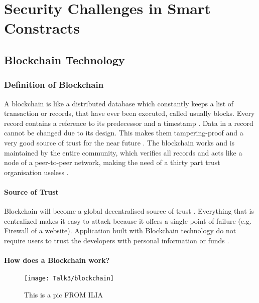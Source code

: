 \chapter{Security Challenges in Smart Constracts}


\newpage

\minitoc %

\newpage


\section{Blockchain Technology}
\subsection{Definition of Blockchain}
A blockchain is like a distributed database which constantly keeps a list of transaction or records, that have ever been executed, called usually blocks. Every record contains a reference to its predecessor and a timestamp \cite{wikipedia1}.
Data in a record cannot be changed due to its design. This makes them tampering-proof and a very good source of trust for the near future \cite{blockchain3}.
The blockchain works and is maintained by the entire community, which verifies all records and acts like a node of a peer-to-peer network, making the need of a thirty part trust organisation useless \cite{blockchain0}.
\subsubsection{Source of Trust}
Blockchain will become a global decentralised source of trust \cite{blockchain3}.
Everything that is centralized makes it easy to attack because it offers a single point of failure (e.g. Firewall of a website). 
Application built with Blockchain technology do not require users to trust the developers with personal information or funds \cite{blockchain3}. 
\subsubsection{How does a Blockchain work?}
           \begin{figure}[ht]
         \begin{center}
         \texttt{[image: Talk3/blockchain]}
         \end{center}
         \caption{This is a pic FROM ILIA}
         \label{label}
       \end{figure}
   
